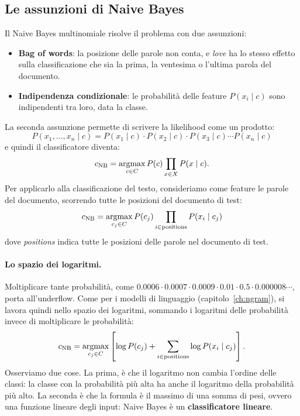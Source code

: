 \subsection{Le assunzioni di Naive Bayes}
Il Naive Bayes multinomiale risolve il problema con due assunzioni:
\begin{itemize}
    \item \textbf{Bag of words}: la posizione delle parole non conta, e \textit{love} ha lo stesso effetto sulla classificazione che sia la prima, la ventesima o l'ultima parola del documento.
    \item \textbf{Indipendenza condizionale}: le probabilità delle feature $P(x_i \mid c)$ sono indipendenti tra loro, data la classe.
\end{itemize}
La seconda assunzione permette di scrivere la likelihood come un prodotto:
\begin{equation}
P(x_1, \dots, x_n \mid c) = P(x_1 \mid c) \cdot P(x_2 \mid c) \cdot P(x_3 \mid c) \cdots P(x_n \mid c)
\end{equation}
e quindi il classificatore diventa:
\begin{equation}
c_{\text{NB}} = \operatorname*{argmax}_{c \in C} P(c) \prod_{x \in X} P(x \mid c).
\end{equation}
Per applicarlo alla classificazione del testo, consideriamo come feature le parole del documento, scorrendo tutte le posizioni del documento di test:
\begin{equation}\label{eq:nb}
c_{\text{NB}} = \operatorname*{argmax}_{c_j \in C} P(c_j) \prod_{i \in \text{positions}} P(x_i \mid c_j)
\end{equation}
dove \textit{positions} indica tutte le posizioni delle parole nel documento di test.

\paragraph{Lo spazio dei logaritmi.} Moltiplicare tante probabilità, come $0.0006 \cdot 0.0007 \cdot 0.0009 \cdot 0.01 \cdot 0.5 \cdot 0.000008 \cdots$, porta all'underflow. Come per i modelli di linguaggio (capitolo~\ref{ch:ngram}), si lavora quindi nello spazio dei logaritmi, sommando i logaritmi delle probabilità invece di moltiplicare le probabilità:
\begin{equation}
c_{\text{NB}} = \operatorname*{argmax}_{c_j \in C} \left[ \log P(c_j) + \sum_{i \in \text{positions}} \log P(x_i \mid c_j) \right].
\end{equation}
Osserviamo due cose. La prima, è che il logaritmo non cambia l'ordine delle classi: la classe con la probabilità più alta ha anche il logaritmo della probabilità più alto. La seconda è che la formula è il massimo di una somma di pesi, ovvero una funzione lineare degli input: Naive Bayes è un \textbf{classificatore lineare}.

